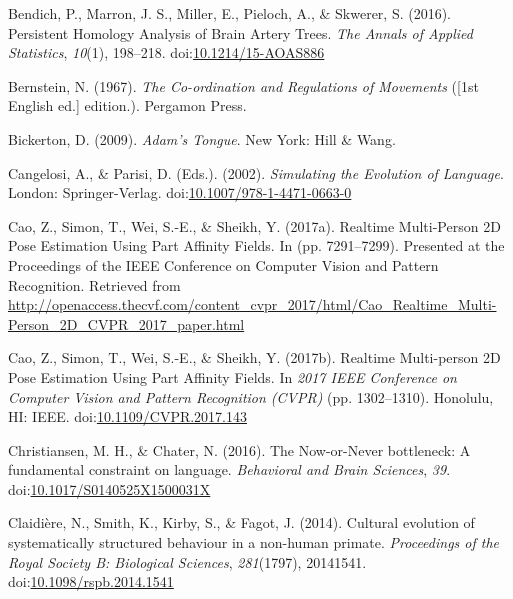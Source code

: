 \documentclass[
  man, noextraspace,floatsintext]{apa6}
\newlength{\cslhangindent}
\newenvironment{cslreferences}%
  {\setlength{\parindent}{0pt}%
  \everypar{\setlength{\hangindent}{\cslhangindent}}\ignorespaces}%
  {\par}
\begin{document}
\begin{cslreferences}
\leavevmode\hypertarget{ref-bendichPersistentHomologyAnalysis2016}{}%
Bendich, P., Marron, J. S., Miller, E., Pieloch, A., \& Skwerer, S. (2016). Persistent Homology Analysis of Brain Artery Trees. \emph{The Annals of Applied Statistics}, \emph{10}(1), 198--218. doi:\href{https://doi.org/10.1214/15-AOAS886}{10.1214/15-AOAS886}

\leavevmode\hypertarget{ref-bernsteinCoordinationRegulationsMovements1967}{}%
Bernstein, N. (1967). \emph{The Co-ordination and Regulations of Movements} ({[}1st English ed.{]} edition.). Pergamon Press.

\leavevmode\hypertarget{ref-bickertonAdamTongue2009}{}%
Bickerton, D. (2009). \emph{Adam's Tongue}. New York: Hill \& Wang.

\leavevmode\hypertarget{ref-cangelosiSimulatingEvolutionLanguage2002}{}%
Cangelosi, A., \& Parisi, D. (Eds.). (2002). \emph{Simulating the Evolution of Language}. London: Springer-Verlag. doi:\href{https://doi.org/10.1007/978-1-4471-0663-0}{10.1007/978-1-4471-0663-0}

\leavevmode\hypertarget{ref-caoRealtimeMultiPerson2D2017}{}%
Cao, Z., Simon, T., Wei, S.-E., \& Sheikh, Y. (2017a). Realtime Multi-Person 2D Pose Estimation Using Part Affinity Fields. In (pp. 7291--7299). Presented at the Proceedings of the IEEE Conference on Computer Vision and Pattern Recognition. Retrieved from \url{http://openaccess.thecvf.com/content_cvpr_2017/html/Cao_Realtime_Multi-Person_2D_CVPR_2017_paper.html}

\leavevmode\hypertarget{ref-caoRealtimeMultiperson2D2017}{}%
Cao, Z., Simon, T., Wei, S.-E., \& Sheikh, Y. (2017b). Realtime Multi-person 2D Pose Estimation Using Part Affinity Fields. In \emph{2017 IEEE Conference on Computer Vision and Pattern Recognition (CVPR)} (pp. 1302--1310). Honolulu, HI: IEEE. doi:\href{https://doi.org/10.1109/CVPR.2017.143}{10.1109/CVPR.2017.143}

\leavevmode\hypertarget{ref-christiansenNoworNeverBottleneckFundamental2016}{}%
Christiansen, M. H., \& Chater, N. (2016). The Now-or-Never bottleneck: A fundamental constraint on language. \emph{Behavioral and Brain Sciences}, \emph{39}. doi:\href{https://doi.org/10.1017/S0140525X1500031X}{10.1017/S0140525X1500031X}

\leavevmode\hypertarget{ref-claidiereCulturalEvolutionSystematically2014}{}%
Claidière, N., Smith, K., Kirby, S., \& Fagot, J. (2014). Cultural evolution of systematically structured behaviour in a non-human primate. \emph{Proceedings of the Royal Society B: Biological Sciences}, \emph{281}(1797), 20141541. doi:\href{https://doi.org/10.1098/rspb.2014.1541}{10.1098/rspb.2014.1541}


\end{cslreferences}
\end{document}
